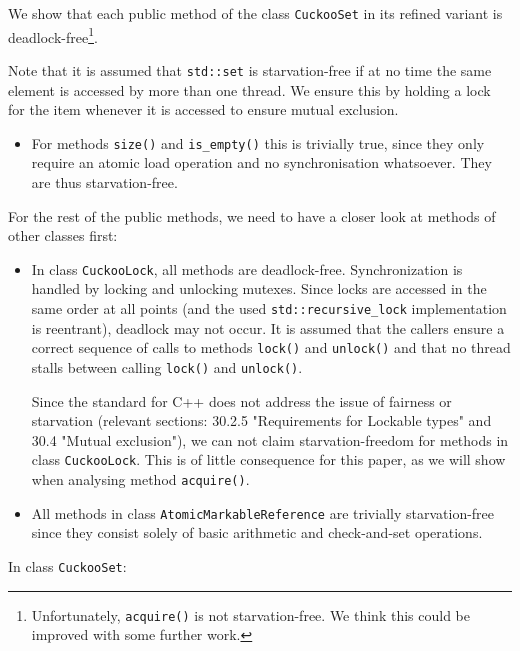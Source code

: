 \documentclass[a4paper,10pt]{article}
\begin{document}
We show that each public method of the class \lstinline|CuckooSet| in its
refined variant is deadlock-free\footnote{Unfortunately, \lstinline|acquire()|
is not starvation-free. We think this could be improved with some further
work.}.

Note that it is assumed that \lstinline|std::set| is
starvation-free if at no time the same element is accessed by more than one
thread. We ensure this by holding a lock for the item whenever it is accessed
to ensure mutual exclusion.

\begin{itemize}
\item For methods \lstinline|size()| and \lstinline|is_empty()| this is
    trivially true, since they only require an atomic load operation and no
    synchronisation whatsoever. They are thus starvation-free.
\end{itemize}

For the rest of the public methods, we need to have a closer look at methods of
other classes first:

\begin{itemize}
\item In class \lstinline|CuckooLock|, all methods are deadlock-free.
    Synchronization is handled by locking and unlocking mutexes. Since locks
    are accessed in the same order at all points (and the used
    \lstinline|std::recursive_lock| implementation is reentrant), deadlock may
    not occur. It is assumed that the callers ensure a correct sequence of
    calls to methods \lstinline|lock()| and \lstinline|unlock()| and that no
    thread stalls between calling \lstinline|lock()| and \lstinline|unlock()|. 

    Since the standard for C++ \cite{cppstandard} does not address the issue of
    fairness or starvation (relevant sections: 30.2.5 "Requirements for Lockable
    types" and 30.4 "Mutual exclusion"), we can not claim starvation-freedom for
    methods in class \lstinline|CuckooLock|. This is of little consequence for this
    paper, as we will show when analysing method \lstinline|acquire()|.

\item All methods in class \lstinline|AtomicMarkableReference| are trivially
    starvation-free since they consist solely of basic arithmetic and check-and-set
    operations.
\end{itemize}

In class \lstinline|CuckooSet|:
\end{document}
